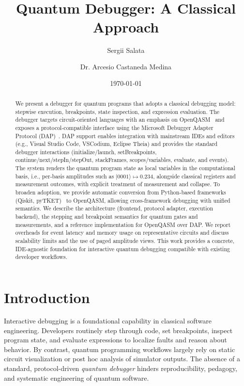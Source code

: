 \documentclass[12pt]{article}
\title{Quantum Debugger: A Classical Approach}
\author[1]{Sergii Salata}
\author[2]{Dr. Arcesio Castaneda Medina}
\affil[1]{Quantag IT Solutions GmbH, Munich, Germany}
\affil[2]{Fraunhofer Institute for Industrial Mathematics (ITWM), Kaiserslautern, Germany}
\date{\today}
\begin{document}
\maketitle


\begin{abstract}
We present a debugger for quantum programs that adopts a classical debugging model: stepwise execution, breakpoints, state inspection, and expression evaluation. The debugger targets circuit-oriented languages with an emphasis on OpenQASM~\cite{openqasm2,openqasm3} and exposes a protocol-compatible interface using the Microsoft Debugger Adapter Protocol (DAP)~\cite{dap}. DAP support enables integration with mainstream IDEs and editors (e.g., Visual Studio Code, VSCodium, Eclipse Theia) and provides the standard debugger interactions (initialize/launch, setBreakpoints, continue/next/stepIn/stepOut, stackFrames, scopes/variables, evaluate, and events). The system renders the quantum program state as local variables in the computational basis, i.e., per-basis amplitudes such as \(|0001\rangle \mapsto 0.234\), alongside classical registers and measurement outcomes, with explicit treatment of measurement and collapse. To broaden adoption, we provide automatic conversion from Python-based frameworks (Qiskit, pyTKET)~\cite{qiskit2024,tket,pytket} to OpenQASM, allowing cross-framework debugging with unified semantics. We describe the architecture (frontend, protocol adapter, execution backend), the stepping and breakpoint semantics for quantum gates and measurements, and a reference implementation for OpenQASM over DAP. We report overheads for event latency and memory usage on representative circuits and discuss scalability limits and the use of paged amplitude views. This work provides a concrete, IDE-agnostic foundation for interactive quantum debugging compatible with existing developer workflows.
\end{abstract}



\section{Introduction}

Interactive debugging is a foundational capability in classical software engineering. Developers routinely step through code, set breakpoints, inspect program state, and evaluate expressions to localize faults and reason about behavior. By contrast, quantum programming workflows largely rely on static circuit visualization or post hoc analysis of simulator outputs. The absence of a standard, protocol-driven \emph{quantum debugger} hinders reproducibility, pedagogy, and systematic engineering of quantum software.
\end{document}
